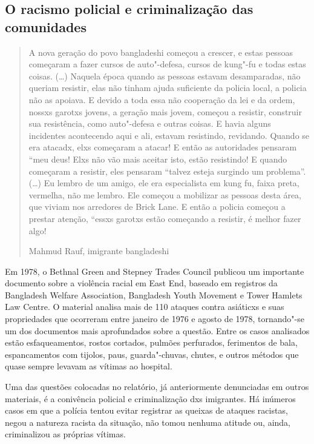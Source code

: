 \subsection{O racismo policial e criminalização das comunidades}

\begin{quote}
A nova geração do povo bangladeshi começou a crescer, e estas pessoas começaram a fazer cursos de auto"-defesa, cursos de kung"-fu e todas estas coisas. (\ldots{}) Naquela época quando as pessoas estavam desamparadas, não queriam resistir, elas não tinham ajuda suficiente da policia local, a policia não as apoiava. E devido a toda essa não cooperação da lei e da ordem, nossxs garotxs jovens, a geração mais jovem, começou a resistir, construir sua resistência, como auto"-defesa e outras coisas. E havia alguns incidentes acontecendo aqui e ali, estavam resistindo, revidando. Quando se era atacadx, elxs começaram a atacar! E então as autoridades pensaram ``meu deus! Elxs não vão mais aceitar isto, estão resistindo! E quando começaram a resistir, eles pensaram ``talvez esteja surgindo um problema''. (\ldots{}) Eu lembro de um amigo, ele era especialista em kung fu, faixa preta, vermelha, não me lembro. Ele começou a mobilizar as pessoas desta área, que viviam nos arredores de Brick Lane. E então a policia começou a prestar atenção, ``essxs garotxs estão começando a resistir, é melhor fazer algo!

Mahmud Rauf, imigrante bangladeshi
\end{quote}

Em 1978, o Bethnal Green and Stepney Trades Council publicou um importante documento sobre a violência racial em East End, baseado em registros da Bangladesh Welfare Association, Bangladesh Youth Movement e Tower Hamlets Law Centre. O material analisa mais de 110 ataques contra asiáticxs e suas propriedades que ocorreram entre janeiro de 1976 e agosto de 1978, tornando"-se um dos documentos mais aprofundados sobre a questão. Entre os casos analisados estão esfaqueamentos, rostos cortados, pulmões perfurados, ferimentos de bala, espancamentos com tijolos, paus, guarda"-chuvas, chutes, e outros métodos que quase sempre levavam as vítimas ao hospital.

Uma das questões colocadas no relatório, já anteriormente denunciadas em outros materiais, é a conivência policial e criminalização dxs imigrantes. Há inúmeros casos em que a polícia tentou evitar registrar as queixas de ataques racistas, negou a natureza racista da situação, não tomou nenhuma atitude ou, ainda, criminalizou as próprias vítimas.

